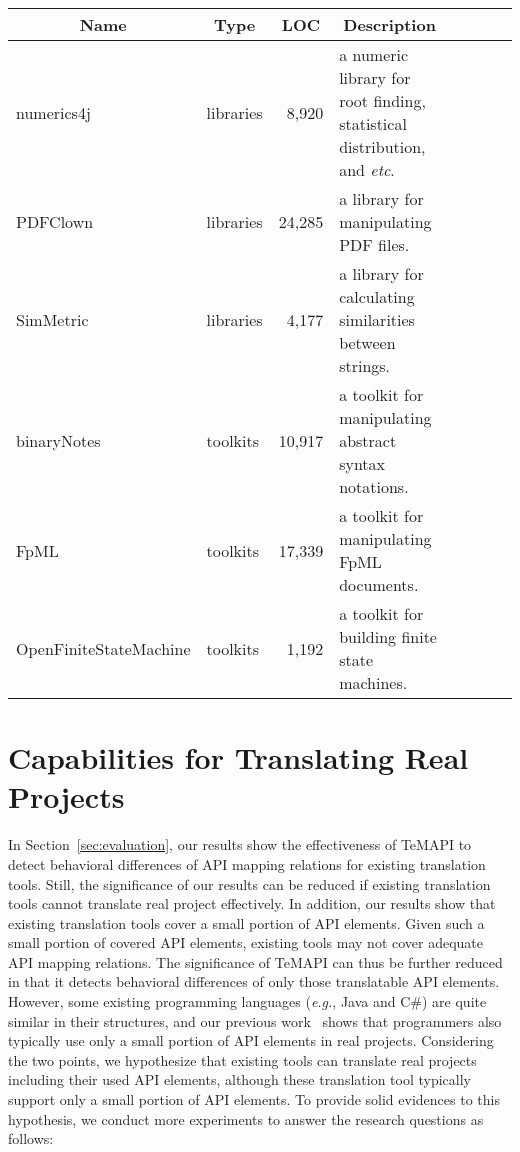 \begin{table*}[t]
\centering
\begin{SmallOut}
\begin {tabular} {|l|l|r|l|c|c|c|c|}
\hline
\multicolumn{1}{|c|}{\textbf{Name}}& \multicolumn{1}{c|}{\textbf{Type}}& \multicolumn{1}{|c|}{\textbf{LOC} } &\multicolumn{1}{c|}{\textbf{Description}}\\
\hline\hline
numerics4j      &  libraries & 8,920   & a numeric library for root finding, statistical distribution, and \emph{etc}. \\
\hline
PDFClown    &  libraries  & 24,285   & a library for manipulating PDF files.\\
\hline
SimMetric & libraries & 4,177 & a library for calculating similarities between strings.\\
\hline
binaryNotes  &  toolkits & 10,917 &  a toolkit for manipulating abstract syntax notations.\\
\hline
FpML         &  toolkits   & 17,339  & a toolkit for manipulating FpML documents. \\
\hline
OpenFiniteStateMachine &  toolkits   & 1,192 & a toolkit for building finite state machines.\\
\hline
\end{tabular}%
 \label{table:subjects2}
\end{SmallOut}%
\end{table*}
\section{Capabilities for Translating Real Projects}
\label{sec:real}
In Section~\ref{sec:evaluation}, our results show the effectiveness of TeMAPI to detect behavioral differences of API mapping relations for existing translation tools. Still, the significance of our results can be reduced if existing translation tools cannot translate real project effectively. In addition, our results show that existing translation tools cover a small portion of API elements. Given such a small portion of covered API elements, existing tools may not cover adequate API mapping relations. The significance of TeMAPI can thus be further reduced in that it detects behavioral differences of only those translatable API elements. However, some existing programming languages (\emph{e.g.}, Java and C\#) are quite similar in their structures, and our previous work~\citep{thummalapentaase08spotweb} shows that programmers also typically use only a small portion of API elements in real projects. Considering the two points, we hypothesize that existing tools can translate real projects including their used API elements, although these translation tool typically support only a small portion of API elements. To provide solid evidences to this hypothesis, we conduct more experiments to answer the research questions as follows:

